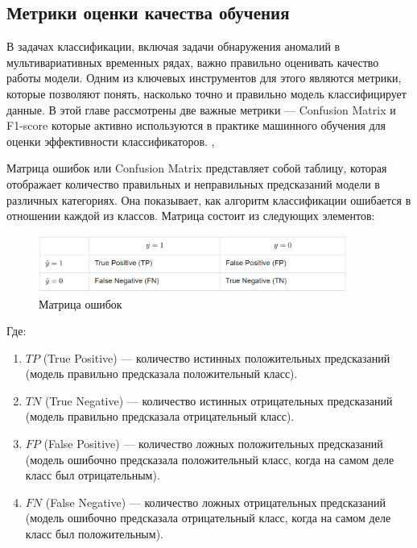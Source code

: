 \documentclass[spec, och, diploma]{SCWorks}
\begin{document}
    \subsection{Метрики оценки качества обучения}

        В задачах классификации, включая задачи обнаружения аномалий в
        мультивариативных временных рядах, важно правильно оценивать качество
        работы модели. Одним из ключевых инструментов для этого являются
        метрики, которые позволяют понять, насколько точно и правильно модель
        классифицирует данные. В этой главе рассмотрены две важные метрики —
        Confusion Matrix и F1-score которые активно используются в практике
        машинного обучения для оценки эффективности классификаторов.
        \cite{scores}, \cite{mat}
        
        Матрица ошибок или Confusion Matrix представляет собой таблицу, которая
        отображает количество правильных и неправильных предсказаний модели в
        различных категориях. Она показывает, как алгоритм классификации
        ошибается в отношении каждой из классов. Матрица состоит из следующих
        элементов:
        
        \begin{figure}[H]
            \centering
            \includegraphics[width=0.9\textwidth]{pic/matrix.png}
            \caption{Матрица ошибок}
        \end{figure}
        
        Где:

        \begin{enumerate}
            \item \( TP \) (True Positive) — количество истинных положительных
            предсказаний (модель правильно предсказала положительный класс).
            \item \( TN \) (True Negative) — количество истинных отрицательных
            предсказаний (модель правильно предсказала отрицательный класс).
            \item \( FP \) (False Positive) — количество ложных положительных
            предсказаний (модель ошибочно предсказала положительный класс, когда
            на самом деле класс был отрицательным).
            \item \( FN \) (False Negative) — количество ложных отрицательных
            предсказаний (модель ошибочно предсказала отрицательный класс, когда
            на самом деле класс был положительным).
        \end{enumerate}
        
\end{document}
